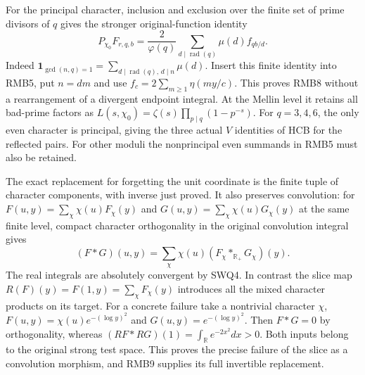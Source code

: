 \documentclass[11pt]{article}
\begin{document}
For the principal character, inclusion and exclusion over the
finite set of prime divisors of $q$ gives the stronger
original-function identity
\begin{equation}\tag{RMB8}
 P_{\chi_0}F_{r,q,b}
  =\frac2{\varphi(q)}
     \sum_{d\mid\operatorname{rad}(q)}\mu(d)f_{qb/d}.
\end{equation}
Indeed $\mathbf1_{\gcd(n,q)=1}
=\sum_{d\mid\operatorname{rad}(q),\,d\mid n}\mu(d)$.
Insert this finite identity into RMB5, put $n=dm$ and use
$f_c=2\sum_{m\ge1}\eta(my/c)$. This proves RMB8
without a rearrangement of a divergent endpoint integral.
At the Mellin level it retains all bad-prime factors as
$L(s,\chi_0)=\zeta(s)\prod_{p\mid q}(1-p^{-s})$.
For $q=3,4,6$, the only even character is principal, giving
the three actual $V$ identities of HCB for the reflected pairs.
For other moduli the nonprincipal even summands in RMB5
must also be retained.

The exact replacement for forgetting the unit coordinate is
the finite tuple of character components, with inverse just
proved. It also preserves convolution: for
$F(u,y)=\sum_\chi\chi(u)F_\chi(y)$ and
$G(u,y)=\sum_\chi\chi(u)G_\chi(y)$ at the same finite level,
compact character orthogonality in the original convolution
integral gives
\begin{equation}\tag{RMB9}
 (F*G)(u,y)=\sum_\chi\chi(u)
                      (F_\chi*_{\mathbb R_+}G_\chi)(y).
\end{equation}
The real integrals are absolutely convergent by SWQ4.
In contrast the slice map $R(F)(y)=F(1,y)=\sum_\chi F_\chi(y)$
introduces all the mixed character products on its target.
For a concrete failure take a nontrivial character $\chi$,
$F(u,y)=\chi(u)e^{-(\log y)^2}$ and
$G(u,y)=e^{-(\log y)^2}$. Then $F*G=0$ by orthogonality,
whereas $(RF*RG)(1)=\int_{\mathbb R}e^{-2x^2}dx>0$.
Both inputs belong to the original strong test space. This
proves the precise failure of the slice as a convolution
morphism, and RMB9 supplies its full invertible replacement.
\end{document}
